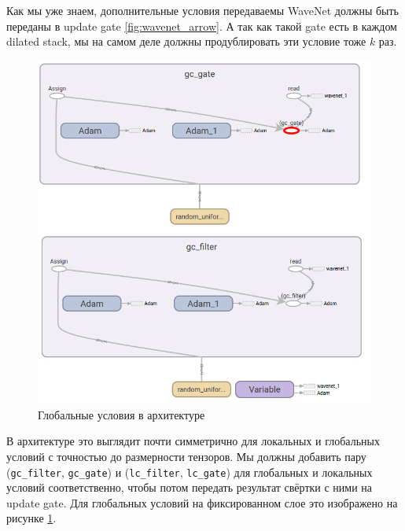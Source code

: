 \documentclass[../diploma.tex]{subfiles}
\begin{document}
Как мы уже знаем, дополнительные условия передаваемы WaveNet должны быть переданы в update gate \ref{fig:wavenet_arrow}. А так как такой gate есть в каждом dilated stack, мы на самом деле должны продублировать эти условие тоже $k$ раз.




\begin{figure}[!htbp]
  \centering
  \includegraphics[scale=1]{img/gc}
  \caption{Глобальные условия в архитектуре}
  \label{fig:gc}
\end{figure}


В архитектуре это выглядит почти симметрично для локальных и глобальных условий с точностью до размерности тензоров. Мы должны добавить пару (\verb|gc_filter|, \verb|gc_gate|) и (\verb|lc_filter|, \verb|lc_gate|) для глобальных и локальных условий соответственно, чтобы потом передать результат свёртки с ними на update gate. Для глобальных условий на фиксированном слое это изображено на рисунке \ref{fig:gc}.
\end{document}
